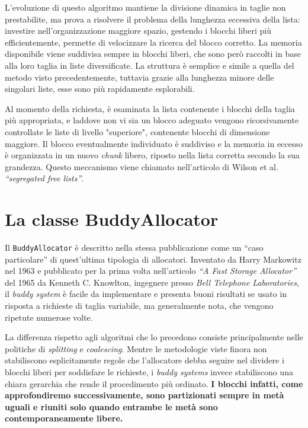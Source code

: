 L’evoluzione di questo algoritmo mantiene la divisione dinamica in taglie non prestabilite, ma prova a risolvere il problema della lunghezza eccessiva della lista: investire nell’organizzazione maggiore spazio, gestendo i blocchi liberi più efficientemente, permette di velocizzare la ricerca del blocco corretto. La memoria disponibile viene suddivisa sempre in blocchi liberi, che sono però raccolti in base alla loro taglia in liste diversificate. La struttura è semplice e simile a quella del metodo visto precedentemente, tuttavia grazie alla lunghezza minore delle singolari liste, esse sono più rapidamente esplorabili.

Al momento della richiesta, è esaminata la lista contenente i blocchi della taglia più appropriata, e laddove non vi sia un blocco adeguato vengono ricorsivamente controllate le liste di livello "superiore", contenente blocchi di dimensione maggiore. Il blocco eventualmente individuato è suddiviso e la memoria in eccesso è organizzata in un nuovo \textit{chunk} libero, riposto nella lista corretta secondo la sua grandezza. Questo meccanismo viene chiamato nell’articolo di Wilson et al. \textit{“segregated free lists”}.


\section{La classe BuddyAllocator}
Il \texttt{BuddyAllocator} è descritto nella stessa pubblicazione come un “caso particolare” di quest'ultima tipologia di allocatori. Inventato da Harry Markowitz nel 1963 e pubblicato per la prima volta nell’articolo \textit{“A Fast Storage Allocator”}\cite{knowlton1965} del 1965 da Kenneth C. Knowlton, ingegnere presso \textit{Bell Telephone Laboratories}, il \textit{buddy system} è facile da implementare e presenta buoni risultati se usato in risposta a richieste di taglia variabile, ma generalmente nota, che vengono ripetute numerose volte.
 
La differenza rispetto agli algoritmi che lo precedono consiste principalmente nelle politiche di \textit{splitting} e \textit{coalescing}. Mentre le metodologie viste finora non stabiliscono esplicitamente regole che l'allocatore debba seguire nel dividere i blocchi liberi per soddisfare le richieste, i \textit{buddy systems} invece stabiliscono una chiara gerarchia che rende il procedimento più ordinato. \textbf{I blocchi infatti, come approfondiremo successivamente, sono partizionati sempre in metà uguali e riuniti solo quando entrambe le metà sono contemporaneamente libere.}

